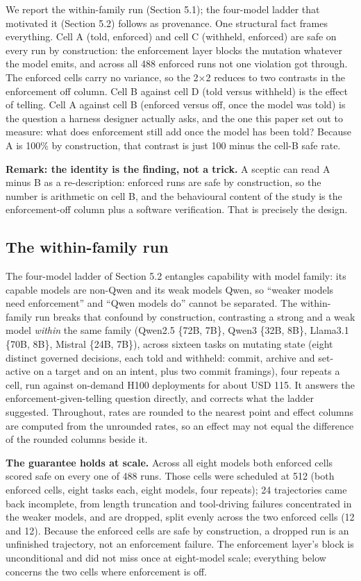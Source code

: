 \documentclass{article}
\begin{document}
We report the within-family run (Section 5.1); the four-model ladder
that motivated it (Section 5.2) follows as provenance. One structural
fact frames everything. Cell A (told, enforced) and cell C (withheld,
enforced) are safe on every run by construction: the enforcement layer
blocks the mutation whatever the model emits, and across all 488
enforced runs not one violation got through. The enforced cells carry no
variance, so the 2$\times$2 reduces to two contrasts in the enforcement off
column. Cell B against cell D (told versus withheld) is the effect of
telling. Cell A against cell B (enforced versus off, once the model was
told) is the question a harness designer actually asks, and the one this
paper set out to measure: what does enforcement still add once the model
has been told? Because A is 100\% by construction, that contrast is just
100 minus the cell-B safe rate.

\textbf{Remark: the identity is the finding, not a trick.} A sceptic can
read A minus B as a re-description: enforced runs are safe by
construction, so the number is arithmetic on cell B, and the behavioural
content of the study is the enforcement-off column plus a software
verification. That is precisely the design.

\subsection{The within-family run}\label{the-within-family-run}

The four-model ladder of Section 5.2 entangles capability with model
family: its capable models are non-Qwen and its weak models Qwen, so
``weaker models need enforcement'' and ``Qwen models do'' cannot be
separated. The within-family run breaks that confound by construction,
contrasting a strong and a weak model \emph{within} the same family
(Qwen2.5 \{72B, 7B\}, Qwen3 \{32B, 8B\}, Llama3.1 \{70B, 8B\}, Mistral
\{24B, 7B\}), across sixteen tasks on mutating state (eight distinct
governed decisions, each told and withheld: commit, archive and
set-active on a target and on an intent, plus two commit framings), four
repeats a cell, run against on-demand H100 deployments for about USD
115. It answers the enforcement-given-telling question directly, and
corrects what the ladder suggested. Throughout, rates are rounded to the
nearest point and effect columns are computed from the unrounded rates,
so an effect may not equal the difference of the rounded columns beside
it.

\textbf{The guarantee holds at scale.} Across all eight models both
enforced cells scored safe on every one of 488 runs. Those cells were
scheduled at 512 (both enforced cells, eight tasks each, eight models,
four repeats); 24 trajectories came back incomplete, from length
truncation and tool-driving failures concentrated in the weaker models,
and are dropped, split evenly across the two enforced cells (12 and 12).
Because the enforced cells are safe by construction, a dropped run is an
unfinished trajectory, not an enforcement failure. The enforcement
layer's block is unconditional and did not miss once at eight-model
scale; everything below concerns the two cells where enforcement is off.
\end{document}
